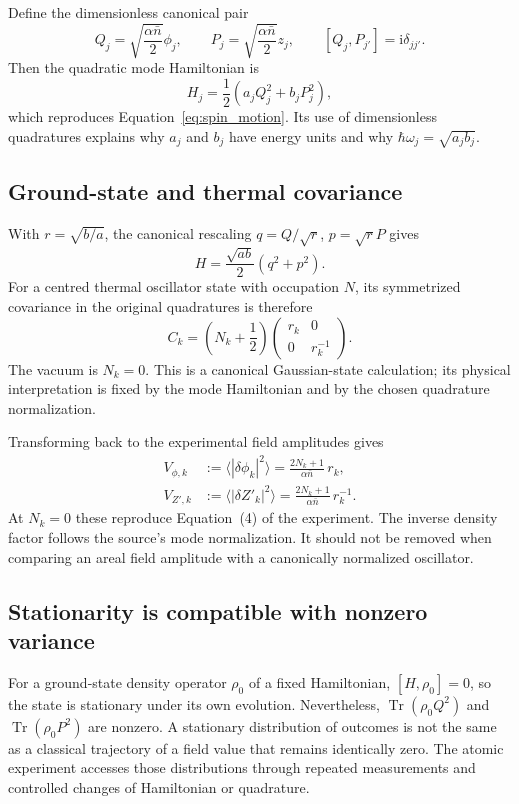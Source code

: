 \documentclass[11pt,a4paper]{article}
\theoremstyle{definition}
\theoremstyle{remark}
\newcommand{\ii}{\mathrm{i}}
\newcommand{\Tr}{\operatorname{Tr}}
\newcommand{\nb}{\bar n}
\begin{document}
Define the dimensionless canonical pair
\begin{equation}
 Q_j=\sqrt{\frac{\alpha\nb}{2}}\phi_j,
 \qquad P_j=\sqrt{\frac{\alpha\nb}{2}}z_j,
 \qquad [Q_j,P_{j'}]=\ii\delta_{jj'}.
 \label{eq:QP}
\end{equation}
Then the quadratic mode Hamiltonian is
\begin{equation}
 H_j=\frac12\left(a_jQ_j^2+b_jP_j^2\right),
 \label{eq:Hmode}
\end{equation}
which reproduces Equation~\eqref{eq:spin_motion}. Its use of dimensionless quadratures explains why $a_j$ and $b_j$ have energy units and why $\hbar\omega_j=\sqrt{a_jb_j}$.

\subsection{Ground-state and thermal covariance}
With $r=\sqrt{b/a}$, the canonical rescaling $q=Q/\sqrt r$, $p=\sqrt r P$ gives
\begin{equation}
 H=\frac{\sqrt{ab}}{2}(q^2+p^2).
 \label{eq:isotropicH}
\end{equation}
For a centred thermal oscillator state with occupation $N$, its symmetrized covariance in the original quadratures is therefore
\begin{equation}
 C_k=\left(N_k+\frac12\right)
 \begin{pmatrix}r_k&0\\0&r_k^{-1}\end{pmatrix}.
 \label{eq:covariance}
\end{equation}
The vacuum is $N_k=0$. This is a canonical Gaussian-state calculation; its physical interpretation is fixed by the mode Hamiltonian and by the chosen quadrature normalization.\cite{weedbrook}

Transforming back to the experimental field amplitudes gives
\begin{align}
 V_{\phi,k}&:=\langle|\delta\phi_k|^2\rangle
       =\frac{2N_k+1}{\alpha\nb}\,r_k,\nonumber\\
 V_{Z',k}&:=\langle|\delta Z'_k|^2\rangle
       =\frac{2N_k+1}{\alpha\nb}\,r_k^{-1}.
 \label{eq:field_variances}
\end{align}
At $N_k=0$ these reproduce Equation~(4) of the experiment. The inverse density factor follows the source's mode normalization. It should not be removed when comparing an areal field amplitude with a canonically normalized oscillator.\cite{zhang2026}

\subsection{Stationarity is compatible with nonzero variance}
For a ground-state density operator $\rho_0$ of a fixed Hamiltonian, $[H,\rho_0]=0$, so the state is stationary under its own evolution. Nevertheless, $\Tr(\rho_0Q^2)$ and $\Tr(\rho_0P^2)$ are nonzero. A stationary distribution of outcomes is not the same as a classical trajectory of a field value that remains identically zero. The atomic experiment accesses those distributions through repeated measurements and controlled changes of Hamiltonian or quadrature.\cite{zhang2026,weedbrook}
\end{document}
